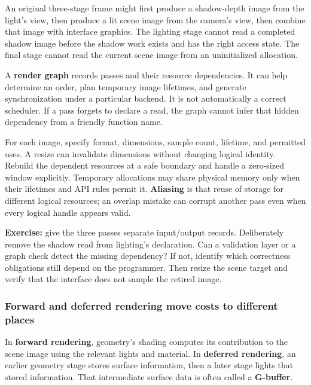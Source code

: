 An original three-stage frame might first produce a shadow-depth image from the light's view, then produce a lit scene image from the camera's view, then combine that image with interface graphics. The lighting stage cannot read a completed shadow image before the shadow work exists and has the right access state. The final stage cannot read the current scene image from an uninitialized allocation.


A \textbf{render graph} records passes and their resource dependencies. It can help determine an order, plan temporary image lifetimes, and generate synchronization under a particular backend. It is not automatically a correct scheduler. If a pass forgets to declare a read, the graph cannot infer that hidden dependency from a friendly function name.

For each image, specify format, dimensions, sample count, lifetime, and permitted uses. A resize can invalidate dimensions without changing logical identity. Rebuild the dependent resources at a safe boundary and handle a zero-sized window explicitly. Temporary allocations may share physical memory only when their lifetimes and API rules permit it. \textbf{Aliasing} is that reuse of storage for different logical resources; an overlap mistake can corrupt another pass even when every logical handle appears valid.

\textbf{Exercise:} give the three passes separate input/output records. Deliberately remove the shadow read from lighting's declaration. Can a validation layer or a graph check detect the missing dependency? If not, identify which correctness obligations still depend on the programmer. Then resize the scene target and verify that the interface does not sample the retired image.

\subsubsection{Forward and deferred rendering move costs to different places}\label{06-engine-ii-ch026-forward-and-deferred-rendering-move-costs-to-different-places}

\hypertarget{06-engine-ii-ch026-forward-and-deferred-rendering-move-costs-to-different-places}{}

In \textbf{forward rendering}, geometry's shading computes its contribution to the scene image using the relevant lights and material. In \textbf{deferred rendering}, an earlier geometry stage stores surface information, then a later stage lights that stored information. That intermediate surface data is often called a \textbf{G-buffer}.

